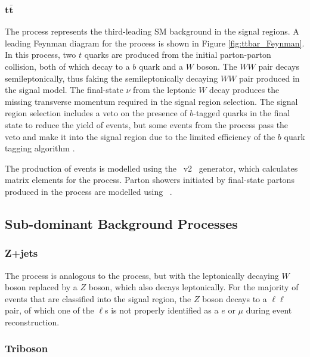 \subsubsection{\(\mathbf{t\bar{t}}\)}
\label{sec:ttbar_description}

The \ttbar process represents the third-leading SM background in the signal regions. A leading Feynman diagram for the process is shown in Figure \ref{fig:ttbar_Feynman}. In this process, two \(t\) quarks are produced from the initial parton-parton collision, both of which decay to a \(b\) quark and a \(W\) boson. The \(WW\) pair decays semileptonically, thus faking the semileptonically decaying \(WW\) pair produced in the signal model. The final-state \(\nu\) from the leptonic \(W\) decay produces the missing transverse momentum required in the signal region selection. The signal region selection includes a veto on the presence of \(b\)-tagged quarks in the final state to reduce the yield of \ttbar events, but some events from the process pass the veto and make it into the signal region due to the limited efficiency of the \(b\) quark tagging algorithm \cite{Varni:2742644}.

The production of \ttbar events is modelled using the \POWHEGBOX~v2~\cite{Frixione:2007nw,Nason:2004rx,Frixione:2007vw,Alioli:2010xd} generator, which calculates matrix elements for the process. Parton showers initiated by final-state partons produced in the \ttbar process are modelled using ~\cite{Sjostrand:2014zea}. 

\subsection{Sub-dominant Background Processes}

\subsubsection{Z+jets}
\label{sec:zjets_description}

The \zjets process is analogous to the \wjets process, but with the leptonically decaying \(W\) boson replaced by a \(Z\) boson, which also decays leptonically. For the majority of \zjets events that are classified into the signal region, the \(Z\) boson decays to a \(\ell\ell\) pair, of which one of the \(\ell\)s is not properly identified as a \(e\) or \(\mu\) during event reconstruction. 

\subsubsection{Triboson}
\label{sec:triboson_description}

